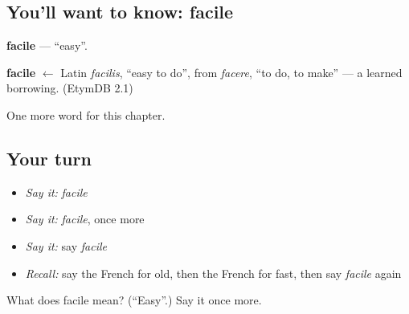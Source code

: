 \subsection*{You'll want to know: facile}
\textbf{facile} — \textquotedblleft{}easy\textquotedblright{}.

\begin{cousinweb}
\textbf{facile} $\leftarrow$ Latin \emph{facilis}, \textquotedblleft{}easy to do\textquotedblright{}, from \emph{facere}, \textquotedblleft{}to do, to make\textquotedblright{} — a learned borrowing. (EtymDB 2.1)
\end{cousinweb}

\begin{grammarlens}[title={What you've built}]
One more word for this chapter.
\end{grammarlens}

\subsection*{Your turn}
\begin{itemize}
\raggedright
  \item \emph{Say it:} \emph{facile}
  \item \emph{Say it:} \emph{facile}, once more
  \item \emph{Say it:} say \emph{facile}
  \item \emph{Recall:} say the French for old, then the French for fast, then say \emph{facile} again
\end{itemize}

\begin{tcolorbox}[breakable,colback=teal!4,colframe=teal!35!black,title={Before you move on}]
What does facile mean? (\textquotedblleft{}Easy\textquotedblright{}.) Say it once more.
\end{tcolorbox}
